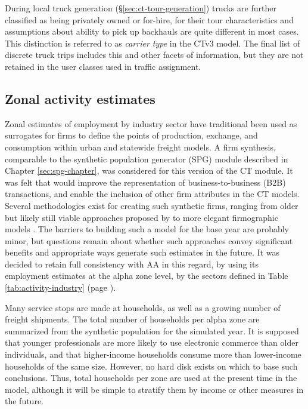 During local truck generation (\S\ref{sec:ct-tour-generation}) trucks are further classified as being privately owned or for-hire, for their tour characteristics and assumptions about ability to pick up backhauls are quite different in most cases. This distinction is referred to as \textit{carrier type} in the CTv3 model. The final list of discrete truck trips includes this and other facets of information, but they are not retained in the user classes used in traffic assignment.

\subsection{Zonal activity estimates}
Zonal estimates of employment by industry sector have traditional been used as surrogates for firms to define the points of production, exchange, and consumption within urban and statewide freight models. A firm synthesis, comparable to the synthetic population generator (SPG) module described in Chapter \ref{sec:spg-chapter}, was considered for this version of the CT module. It was felt that would improve the representation of business-to-business (B2B) transactions, and enable the inclusion of other firm attributes in the CT models. Several methodologies exist for creating such synthetic firms, ranging from older but likely still viable approaches proposed by \cite{chiang76} to more elegant firmographic models \citep{moeckel06, pagliara13}. The barriers to building such a model for the base year are probably minor, but questions remain about whether such approaches convey significant benefits and appropriate ways generate such estimates in the future. It was decided to retain full consistency with AA in this regard, by using its employment estimates at the alpha zone level, by the sectors defined in Table \ref{tab:activity-industry} (page \pageref{tab:activity-industry}).

Many service stops are made at households, as well as a growing number of freight shipments. The total number of households per alpha zone are summarized from the synthetic population for the simulated year. It is supposed that younger professionals are more likely to use electronic commerce than older individuals, and that higher-income households consume more than lower-income households of the same size. However, no hard disk exists on which to base such conclusions. Thus, total households per zone are used at the present time in the model, although it will be simple to stratify them by income or other measures in the future.

